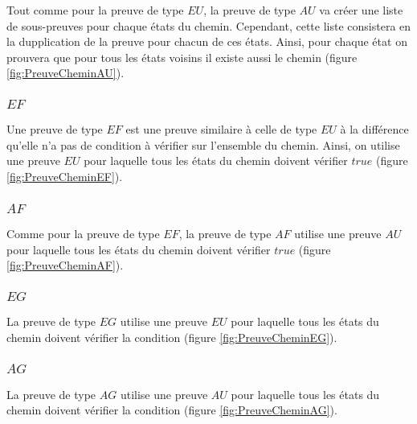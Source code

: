 \documentclass[dvipsnames]{report}
\begin{document}
Tout comme pour la preuve de type $EU$, la preuve de type $AU$ va créer une liste de sous-preuves pour chaque états du chemin. Cependant, cette liste consistera en la dupplication de la preuve pour chacun de ces états. Ainsi, pour chaque état on prouvera que pour tous les états voisins il existe aussi le chemin (figure \ref{fig:PreuveCheminAU}).



\subsubsection{$EF$}

Une preuve de type $EF$ est une preuve similaire à celle de type $EU$ à la différence qu'elle n'a pas de condition à vérifier sur l'ensemble du chemin. Ainsi, on utilise une preuve $EU$ pour laquelle tous les états du chemin doivent vérifier $true$ (figure \ref{fig:PreuveCheminEF}).



\subsubsection{$AF$}

Comme pour la preuve de type $EF$, la preuve de type $AF$ utilise une preuve $AU$ pour laquelle tous les états du chemin doivent vérifier $true$ (figure \ref{fig:PreuveCheminAF}).



\subsubsection{$EG$}

La preuve de type $EG$ utilise une preuve $EU$ pour laquelle tous les états du chemin doivent vérifier la condition (figure \ref{fig:PreuveCheminEG}).



\subsubsection{$AG$}

La preuve de type $AG$ utilise une preuve $AU$ pour laquelle tous les états du chemin doivent vérifier la condition (figure \ref{fig:PreuveCheminAG}).


\end{document}
